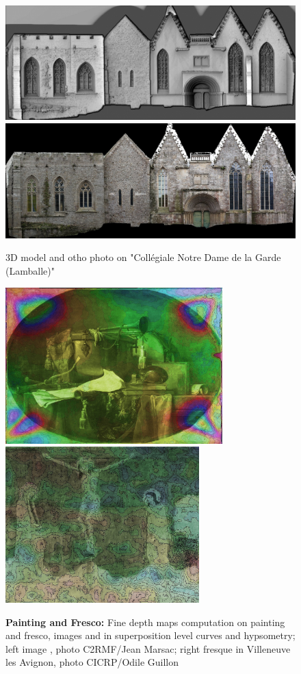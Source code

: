 \begin{figure}
\includegraphics[width=150mm]{FIGS/SAMPLES/LambaleShade.jpg}
\includegraphics[width=150mm]{FIGS/SAMPLES/Lamballe-Ortho-Test-Redr.jpg}
\caption{3D model and otho photo on "Collégiale Notre Dame de la Garde (Lamballe)"}
\end{figure}




\begin{figure}
\includegraphics[width=84mm]{FIGS/SAMPLES/Louvre-Superp.jpg}
\includegraphics[width=75mm]{FIGS/SAMPLES/FresqVilAv.jpg}
\caption{{\bf Painting and Fresco: } Fine depth maps computation on painting and fresco,
images and in superposition level curves and hypsometry;
left image  , photo C2RMF/Jean Marsac; right fresque in Villeneuve
les Avignon, photo CICRP/Odile Guillon}
\end{figure}



